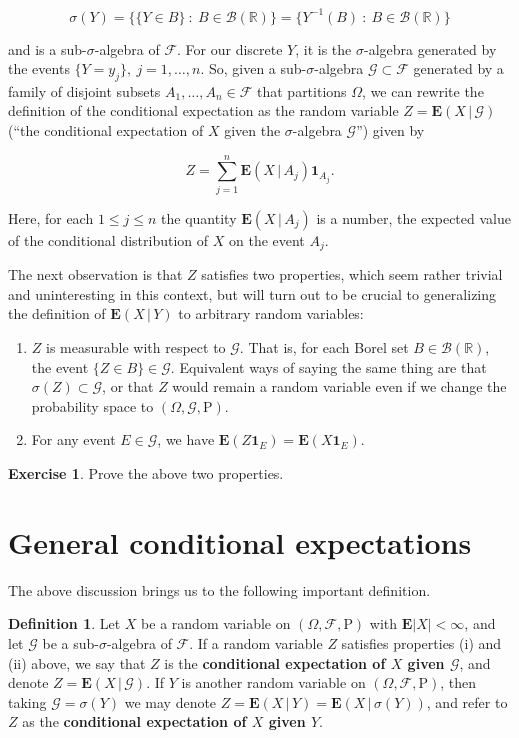 \documentclass[11pt]{report}
\newcommand{\R}{\mathbb{R}}
\theoremstyle{plain}
\theoremstyle{definition}
\newtheorem{defn}[thm]{Definition}
\newtheorem{xexercise}[thm]{Exercise}
\begin{document}
\[
\sigma(Y) = \big\{ \{Y \in B\}\ :\ B\in\mathcal{B}(\R) \big\}
= \{ Y^{-1}(B)\ :\ B\in\mathcal{B}(\R) \}
\]

and is a sub-$\sigma$-algebra of $\mathcal{F}$. For our discrete $Y$, it is the $\sigma$-algebra generated by the events $\{Y=y_j\}, \ j=1,\ldots,n$. So, given a sub-$\sigma$-algebra $\mathcal{G} \subset \mathcal{F}$ generated by a family of disjoint subsets $A_1,\ldots,A_n \in \mathcal{F}$ that partitions $\Omega$, we can rewrite the definition of the conditional expectation as the random variable $Z = \mathbf{E}\left(X\,|\,\mathcal{G}\right)$ (``the conditional expectation of $X$ given the $\sigma$-algebra $\mathcal{G}$'') given by

\[
Z = \sum_{j=1}^n \mathbf{E}\left(X\,|\,A_j\right) \mathbf{1}_{A_j}.
\]

Here, for each $1\le j\le n$ the quantity $\mathbf{E}\left(X\,|\,A_j\right)$ is a number, the expected value of the conditional distribution of $X$ on the event $A_j$.

The next observation is that $Z$ satisfies two properties, which seem rather trivial and uninteresting in this context, but will turn out to be crucial to generalizing the definition of $\mathbf{E}\left(X\,|\,Y\right)$ to arbitrary random variables:

\begin{enumerate}[label=(\roman*)]
\item $Z$ is measurable with respect to $\mathcal{G}$. That is, for each Borel set $B\in \mathcal{B}(\R)$, the event $\{Z\in B\} \in \mathcal{G}$. Equivalent ways of saying the same thing are that $\sigma(Z)\subset \mathcal{G}$, or that $Z$ would remain a random variable even if we change the probability space to $(\Omega,\mathcal{G},\mathrm{P})$.
\item For any event $E \in \mathcal{G}$, we have $\mathbf{E}(Z \mathbf{1}_E) = \mathbf{E}(X \mathbf{1}_E)$.
\end{enumerate}

\begin{xexercise}
Prove the above two properties.
\end{xexercise}

\section{General conditional expectations}
The above discussion brings us to the following important definition.

\begin{defn}
Let $X$ be a random variable on $(\Omega, \mathcal{F}, \mathrm{P})$ with $\mathbf{E}|X|<\infty$, and let $\mathcal{G}$ be a sub-$\sigma$-algebra of $\mathcal{F}$. If a random variable $Z$ satisfies properties (i) and (ii) above, we say that $Z$ is the \textbf{conditional expectation of $X$ given $\mathcal{G}$}, and denote $Z = \mathbf{E}\left(X\,|\,\mathcal{G}\right)$. If $Y$ is another random variable on $(\Omega, \mathcal{F}, \mathrm{P})$, then taking $\mathcal{G}=\sigma(Y)$ we may denote $Z = \mathbf{E}\left(X\,|\,Y\right) = \mathbf{E}\left(X\,|\,\sigma(Y)\right)$, and refer to $Z$ as the \textbf{conditional expectation of $X$ given $Y$}.
\end{defn}
\end{document}
